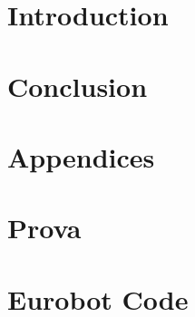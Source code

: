 \documentclass[11pt, twoside]{article}
\begin{document}
\clearpage


\setcounter{tocdepth}{3}

\tableofcontents

\clearpage



\printnoidxglossaries

\cleardoublepage




\section{Introduction}
\label{sec:introduction}


%

\section{Conclusion}
\label{sec:conclusion}








\clearpage


\setcounter{subsection}{0}
\setcounter{section}{0}


\section*{Appendices}%

\renewcommand\thesection{\Alph{section}}
\renewcommand\thesubsection{\thesection.\arabic{subsection}}%


\section{Prova}
\label{app:prova}


%

\section{Eurobot Code}
\label{app:placeholder}
\inputminted[xleftmargin=\parindent,linenos, baselinestretch=0.9, fontsize=\footnotesize]{c}{code/caca.txt}


\clearpage

\printbibliography
{}


\end{document}
